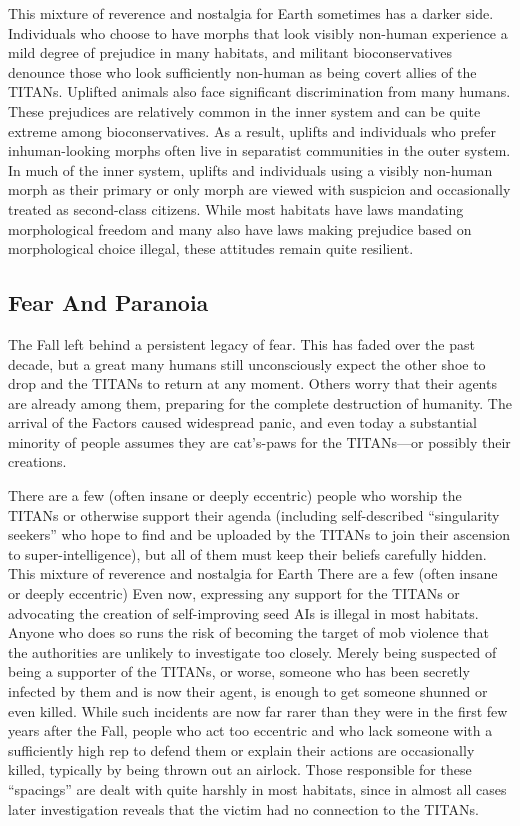 This mixture of reverence and nostalgia for Earth 
sometimes has a darker side. Individuals who choose 
to have morphs that look visibly non-human experience a mild degree of prejudice in many habitats, 
and militant bioconservatives denounce those who 
look sufficiently non-human as being covert allies 
of the TITANs. Uplifted animals also face significant 
discrimination from many humans. These prejudices 
are relatively common in the inner system and can 
be quite extreme among bioconservatives. As a result, 
uplifts and individuals who prefer inhuman-looking 
morphs often live in separatist communities in the 
outer system. In much of the inner system, uplifts and 
individuals using a visibly non-human morph as their 
primary or only morph are viewed with suspicion and 
occasionally treated as second-class citizens. While 
most habitats have laws mandating morphological 
freedom and many also have laws making prejudice 
based on morphological choice illegal, these attitudes 
remain quite resilient.

\subsection{Fear And Paranoia}

The Fall left behind a persistent legacy of fear. This has 
faded over the past decade, but a great many humans 
still unconsciously expect the other shoe to drop and 
the TITANs to return at any moment. Others worry 
that their agents are already among them, preparing for 
the complete destruction of humanity. The arrival of 
the Factors caused widespread panic, and even today a 
substantial minority of people assumes they are cat's-paws for the TITANs—or possibly their creations.

There are a few (often insane or deeply eccentric) 
people who worship the TITANs or otherwise support 
their agenda (including self-described ``singularity 
seekers'' who hope to find and be uploaded by the 
TITANs to join their ascension to super-intelligence), 
but all of them must keep their beliefs carefully hidden. 
This mixture of reverence and nostalgia for Earth 
There are a few (often insane or deeply eccentric) 
Even now, expressing any support for the TITANs or 
advocating the creation of self-improving seed AIs 
is illegal in most habitats. Anyone who does so runs 
the risk of becoming the target of mob violence that 
the authorities are unlikely to investigate too closely. 
Merely being suspected of being a supporter of the 
TITANs, or worse, someone who has been secretly 
infected by them and is now their agent, is enough 
to get someone shunned or even killed. While such 
incidents are now far rarer than they were in the first 
few years after the Fall, people who act too eccentric 
and who lack someone with a sufficiently high rep to 
defend them or explain their actions are occasionally 
killed, typically by being thrown out an airlock. Those 
responsible for these ``spacings'' are dealt with quite 
harshly in most habitats, since in almost all cases later 
investigation reveals that the victim had no connection to the TITANs.

